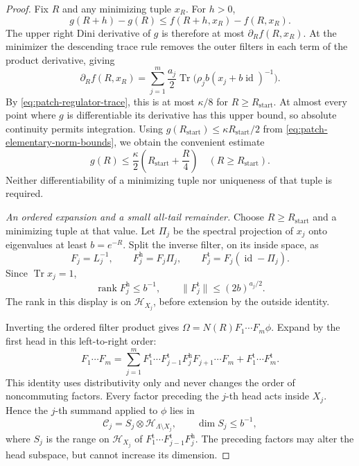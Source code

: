 \documentclass[11pt]{article}
\numberwithin{equation}{section}
\theoremstyle{definition}
\theoremstyle{remark}
\DeclareMathOperator{\Tr}{Tr}
\DeclareMathOperator{\rank}{rank}
\DeclareMathOperator{\id}{id}
\newcommand{\norm}[1]{\lVert #1\rVert}
\begin{document}
\begin{proof}
Fix \(R\) and any minimizing tuple \(x_R\).  For \(h>0\),
\[
 g(R+h)-g(R)
       \leq f(R+h,x_R)-f(R,x_R).
\]
The upper right Dini derivative of \(g\) is therefore at most
\(\partial_R f(R,x_R)\).  At the minimizer the descending
trace rule removes the outer filters in each term of the product
derivative, giving
\[
 \partial_R f(R,x_R)
       =\sum_{j=1}^m\frac{a_j}{2}
          \Tr\bigl(\rho_j b(x_j+b\id)^{-1}\bigr).
\]
By \eqref{eq:patch-regulator-trace}, this is at most
\(\kappa/8\) for \(R\geq R_{\mathrm{start}}\).
At almost every point where \(g\) is differentiable its derivative
has this upper bound, so absolute continuity permits integration.
Using \(g(R_{\mathrm{start}})\leq
\kappa R_{\mathrm{start}}/2\) from
\eqref{eq:patch-elementary-norm-bounds}, we obtain the convenient
estimate
\begin{equation}
 g(R)\leq\frac{\kappa}{2}
                 \left(R_{\mathrm{start}}+\frac R4\right)
       \quad(R\geq R_{\mathrm{start}}).
 \label{eq:patch-minimum-growth}
\end{equation}
Neither differentiability of a minimizing tuple nor uniqueness of
that tuple is required.

\emph{An ordered expansion and a small all-tail remainder.}
Choose \(R\geq R_{\mathrm{start}}\) and a minimizing tuple at
that value.  Let \(\Pi_j\) be the spectral projection of \(x_j\)
onto eigenvalues at least \(b=e^{-R}\).  Split the inverse filter,
on its inside space, as
\[
 F_j=L_j^{-1},\qquad
 F_j^{\mathrm h}=F_j\Pi_j,\qquad
 F_j^{\mathrm t}=F_j(\id-\Pi_j).
\]
Since \(\Tr x_j=1\),
\begin{equation}
 \rank F_j^{\mathrm h}\leq b^{-1},
 \qquad
 \norm{F_j^{\mathrm t}}\leq(2b)^{a_j/2}.
 \label{eq:patch-head-tail-bounds}
\end{equation}
The rank in this display is on \(\mathcal H_{X_j}\), before
extension by the outside identity.

Inverting the ordered filter product gives
\(\Omega=N(R)F_1\cdots F_m\phi\).
Expand by the first head in this left-to-right order:
\begin{equation}
 F_1\cdots F_m
   =\sum_{j=1}^m
        F_1^{\mathrm t}\cdots F_{j-1}^{\mathrm t}
        F_j^{\mathrm h}F_{j+1}\cdots F_m
      +F_1^{\mathrm t}\cdots F_m^{\mathrm t}.
 \label{eq:patch-first-head-expansion}
\end{equation}
This identity uses distributivity only and never changes the order
of noncommuting factors.  Every factor preceding the \(j\)-th head
acts inside \(X_j\).  Hence the \(j\)-th summand applied to \(\phi\)
lies in
\[
 \mathcal C_j=S_j\otimes\mathcal H_{\Lambda\setminus X_j},
 \qquad
 \dim S_j\leq b^{-1},
\]
where \(S_j\) is the range on \(\mathcal H_{X_j}\) of
\(F_1^{\mathrm t}\cdots F_{j-1}^{\mathrm t}F_j^{\mathrm h}\).
The preceding factors may alter the head subspace, but cannot
increase its dimension.


\end{proof}
\end{document}
